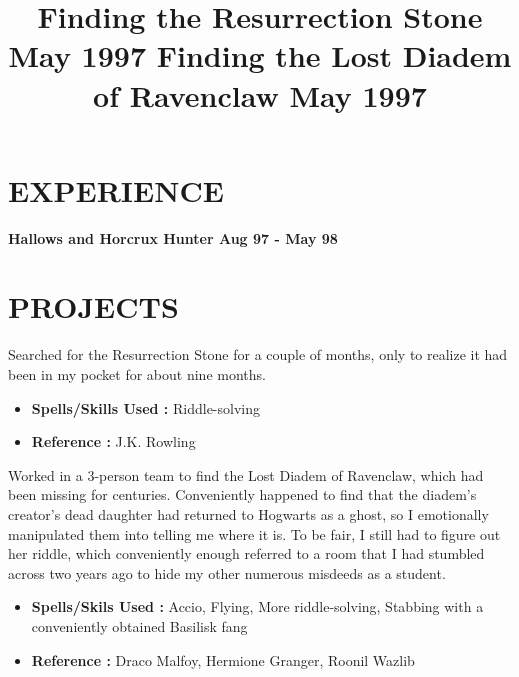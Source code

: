 \documentclass[margin]{res}
\begin{document}
\begin{resume}
\section{EXPERIENCE}

\textbf{Hallows and Horcrux Hunter \hfill{Aug 97 - May 98}\\}

\section{PROJECTS}
\title{\textbf{Finding the Resurrection Stone \hfill May 1997}
 }
\begin{position}
Searched for the Resurrection Stone for a couple of months, only to realize it had been in my pocket for about nine months.
\begin{itemize}
\item \textbf{Spells/Skills Used :} Riddle-solving
\end{itemize}
\begin{itemize}
\item \textbf{Reference :} J.K. Rowling
\end{itemize}
\end{position}

\title{\textbf{Finding the Lost Diadem of Ravenclaw \hfill May 1997}
 }
\begin{position}
Worked in a 3-person team to find the Lost Diadem of Ravenclaw, which had been missing for centuries. Conveniently happened to find that the diadem's creator's dead daughter had returned to Hogwarts as a ghost, so I emotionally manipulated them into telling me where it is. To be fair, I still had to figure out her riddle, which conveniently enough referred to a room that I had stumbled across two years ago to hide my other numerous misdeeds as a student.
\begin{itemize}
\item \textbf{Spells/Skils Used :} Accio, Flying, More riddle-solving, Stabbing with a conveniently obtained Basilisk fang
\end{itemize}
\begin{itemize}
\item \textbf{Reference :} Draco Malfoy, Hermione Granger, Roonil Wazlib
\end{itemize}
\end{position}



\end{resume}
\end{document}
